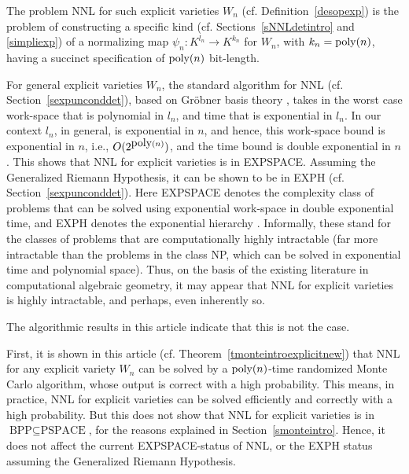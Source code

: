 \documentclass[11pt]{article}
\begin{document}
The problem NNL for such explicit varieties $W_n$ (cf. Definition~\ref{desopexp}) 
is the problem of constructing a specific kind (cf. Sections~\ref{sNNLdetintro} and \ref{simpliexp}) of 
a normalizing map $\psi_n: K^{l_n} \rightarrow K^{k_n}$ for $W_n$,
with $k_n={\mbox {poly}}(n)$, having  a  
succinct specification of ${\mbox {poly}}(n)$ bit-length.


For general   explicit varieties $W_n$, 
the standard  algorithm for NNL  (cf. Section~\ref{sexpunconddet}), 
based on Gr\"obner basis theory \cite{mayr2},
takes in the worst case  work-space  that is polynomial in $l_n$,
and time that is exponential in $l_n$.
In our context $l_n$, in general,  is exponential in $n$, and hence,  this work-space bound is  exponential in $n$, i.e., $O(2^{{\mbox {poly}}(n)})$, 
and the time bound  is double exponential in $n$.
This  shows that   NNL for explicit varieties is in EXPSPACE.
Assuming the Generalized  Riemann Hypothesis, it can be shown to be in EXPH (cf. Section~\ref{sexpunconddet}).
Here EXPSPACE denotes 
the  complexity class of problems that can be solved using exponential work-space in double exponential time,
and EXPH denotes  the exponential hierarchy \cite{arora}.
Informally, these stand for the classes 
 of problems  that are computationally highly intractable (far more intractable
than the problems in the class  NP, which  can be solved in exponential time and 
polynomial space).
Thus, on the basis of the existing literature in computational algebraic geometry,
it may appear that NNL for explicit varieties is highly intractable, and perhaps,
even inherently so.

The  algorithmic results in this article indicate that this is not  the case.

First, it is shown in this article (cf. Theorem~\ref{tmonteintroexplicitnew}) that  NNL for any explicit variety $W_n$ can be solved 
by a ${\mbox {poly}}(n)$-time randomized Monte Carlo algorithm, whose output is correct with a high probability. This means, in practice, NNL for explicit varieties 
can be solved efficiently and correctly with
a high probability. %
But this  does not show that  NNL for explicit varieties 
is in $\mbox{BPP} \subseteq \mbox{PSPACE}$, for the reasons explained in Section~\ref{smonteintro}.
Hence, it does not affect the  current EXPSPACE-status of NNL, or the EXPH status assuming the Generalized Riemann Hypothesis.
\end{document}
